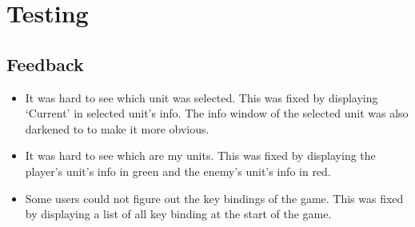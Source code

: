 \section{Testing}

\subsection{Feedback}
\begin{itemize}
	\item It was hard to see which unit was selected. This was fixed by  displaying `Current' in selected unit's info. The info window of the selected unit was also darkened to to make it more obvious.
	
	\item It was hard to see which are my units. This was fixed by displaying the player's unit's info in green and the enemy's unit's info in red. 
	
	\item Some users could not figure out the key bindings of the game. This was fixed by displaying a list of all key binding at the start of the game.
\end{itemize}